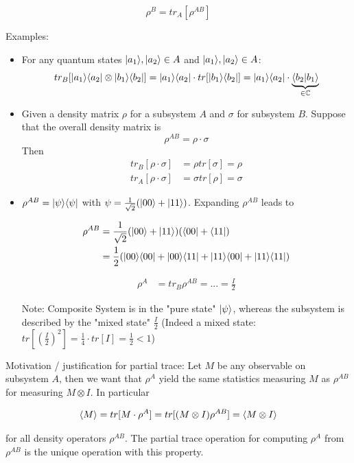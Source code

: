 \begin{equation}
    \rho^B = tr_A [\rho^{AB}]
\end{equation}

Examples:
\begin{itemize}
    \item For any quantum states $\lvert a_1\rangle, \lvert a_2\rangle \in A$ and $\lvert a_1\rangle, \lvert a_2\rangle \in A$:
    \begin{equation}
        tr_B [\lvert a_1\rangle \langle a_2\rvert \otimes \lvert b_1\rangle\langle b_2\rvert] =
        \lvert a_1\rangle\langle a_2\rvert \cdot tr[\lvert b_1\rangle\langle b_2\rvert] = 
        \lvert a_1\rangle\langle a_2\rvert \cdot \underbrace{\langle b_2 | b_1 \rangle}_{\in \mathbb{C}}
    \end{equation}

    \item Given a density matrix $\rho$ for a subsystem $A$ and $\sigma$ for subsystem $B$.
    Suppose that the overall density matrix is 
    \begin{equation}
        \rho^{AB} = \rho \cdot \sigma
    \end{equation}
    Then 
    \begin{align}
        tr_B[\rho \cdot \sigma] &= \rho tr[\sigma] = \rho \\ 
        tr_A[\rho \cdot \sigma] &= \sigma tr[\rho] = \sigma 
    \end{align}

    \item $\rho^{AB} = \lvert\psi\rangle \langle\psi\rvert$ with $\psi = \frac{1}{\sqrt{2}} (\lvert00\rangle + \lvert11\rangle)$. 
    Expanding $\rho^{AB}$ leads to

    \begin{align*}
        \rho^{AB} &= \frac{1}{\sqrt{2}} (\lvert00\rangle + \lvert11\rangle) (\langle00\rvert + \langle11\rvert) \\
        &= \frac{1}{2} (\lvert00\rangle\langle00\rvert + \lvert00\rangle\langle11\rvert + \lvert11\rangle\langle00\rvert + \lvert11\rangle\langle11\rvert) \\
    \end{align*}

    \begin{align*}
        \rho^A &= tr_B{\rho^{AB}} = ... = \frac{I}{2}
    \end{align*}

    Note: Composite System is in the "pure state" $\lvert\psi\rangle$, whereas the subsystem is described by the 
    "mixed state" $\frac{I}{2}$
    (Indeed a mixed state: $tr[(\frac{I}{2})^2] = \frac{1}{4} \cdot tr[I] = \frac{1}{2} < 1$)
\end{itemize}

Motivation / justification for partial trace:
Let $M$ be any observable on subsystem $A$, then we want that $\rho^A$ yield the same statistics
measuring $M$ as $\rho^{AB}$ for measuring $M \otimes I$. In particular

\begin{equation}
    \langle M \rangle = tr[M \cdot \rho^A] = tr[(M \otimes I) \rho^{AB}] = \langle M \otimes I \rangle
\end{equation}

for all density operators $\rho^{AB}$. The partial trace operation for computing 
$\rho^A$ from $\rho^{AB}$ is the unique operation with this property.
